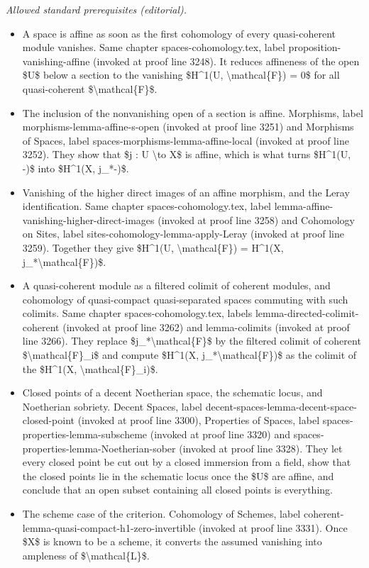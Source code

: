 \documentclass[10pt,a4paper]{amsart}
\theoremstyle{plain}
\theoremstyle{definition}
\theoremstyle{remark}
\numberwithin{equation}{subsection}
\begin{document}
\noindent\textit{Allowed standard prerequisites (editorial).}\begin{itemize}
\item A space is affine as soon as the first cohomology of every quasi-coherent module vanishes. Same chapter spaces-cohomology.tex, label proposition-vanishing-affine (invoked at proof line 3248). It reduces affineness of the open \$U\$ below a section to the vanishing \$H\textasciicircum{}1(U, \textbackslash{}mathcal\{F\}) = 0\$ for all quasi-coherent \$\textbackslash{}mathcal\{F\}\$.
\item The inclusion of the nonvanishing open of a section is affine. Morphisms, label morphisms-lemma-affine-s-open (invoked at proof line 3251) and Morphisms of Spaces, label spaces-morphisms-lemma-affine-local (invoked at proof line 3252). They show that \$j : U \textbackslash{}to X\$ is affine, which is what turns \$H\textasciicircum{}1(U, -)\$ into \$H\textasciicircum{}1(X, j\_*-)\$.
\item Vanishing of the higher direct images of an affine morphism, and the Leray identification. Same chapter spaces-cohomology.tex, label lemma-affine-vanishing-higher-direct-images (invoked at proof line 3258) and Cohomology on Sites, label sites-cohomology-lemma-apply-Leray (invoked at proof line 3259). Together they give \$H\textasciicircum{}1(U, \textbackslash{}mathcal\{F\}) = H\textasciicircum{}1(X, j\_*\textbackslash{}mathcal\{F\})\$.
\item A quasi-coherent module as a filtered colimit of coherent modules, and cohomology of quasi-compact quasi-separated spaces commuting with such colimits. Same chapter spaces-cohomology.tex, labels lemma-directed-colimit-coherent (invoked at proof line 3262) and lemma-colimits (invoked at proof line 3266). They replace \$j\_*\textbackslash{}mathcal\{F\}\$ by the filtered colimit of coherent \$\textbackslash{}mathcal\{F\}\_i\$ and compute \$H\textasciicircum{}1(X, j\_*\textbackslash{}mathcal\{F\})\$ as the colimit of the \$H\textasciicircum{}1(X, \textbackslash{}mathcal\{F\}\_i)\$.
\item Closed points of a decent Noetherian space, the schematic locus, and Noetherian sobriety. Decent Spaces, label decent-spaces-lemma-decent-space-closed-point (invoked at proof line 3300), Properties of Spaces, label spaces-properties-lemma-subscheme (invoked at proof line 3320) and spaces-properties-lemma-Noetherian-sober (invoked at proof line 3328). They let every closed point be cut out by a closed immersion from a field, show that the closed points lie in the schematic locus once the \$U\$ are affine, and conclude that an open subset containing all closed points is everything.
\item The scheme case of the criterion. Cohomology of Schemes, label coherent-lemma-quasi-compact-h1-zero-invertible (invoked at proof line 3331). Once \$X\$ is known to be a scheme, it converts the assumed vanishing into ampleness of \$\textbackslash{}mathcal\{L\}\$.
\end{itemize}\medskip
\end{document}
